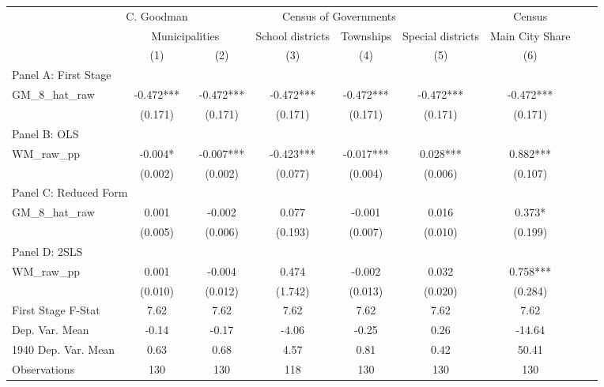  \begin{tabular}{l*{8}{c}} \toprule
&\multicolumn{1}{c}{C. Goodman}&\multicolumn{4}{c}{Census of Governments}&\multicolumn{1}{c}{Census}\\\cmidrule(lr){2-2}\cmidrule(lr){3-6}\cmidrule(lr){7-7}
&\multicolumn{2}{c}{Municipalities}&\multicolumn{1}{c}{School districts}&\multicolumn{1}{c}{Townships}&\multicolumn{1}{c}{Special districts}&\multicolumn{1}{c}{Main City Share}\\\cmidrule(lr){2-3}\cmidrule(lr){4-6}\cmidrule(lr){7-7}
&\multicolumn{1}{c}{(1)}&\multicolumn{1}{c}{(2)}&\multicolumn{1}{c}{(3)}&\multicolumn{1}{c}{(4)}&\multicolumn{1}{c}{(5)}&\multicolumn{1}{c}{(6)}\\
\cmidrule(lr){1-7}
\multicolumn{6}{l}{Panel A: First Stage}\\
\cmidrule(lr){1-7}
GM\_8\_hat\_raw    &   -0.472***&   -0.472***&   -0.472***&   -0.472***&   -0.472***&   -0.472***\\
                &  (0.171)   &  (0.171)   &  (0.171)   &  (0.171)   &  (0.171)   &  (0.171)   \\
\cmidrule(lr){1-7}
\multicolumn{6}{l}{Panel B: OLS}\\
\cmidrule(lr){1-7}
WM\_raw\_pp       &   -0.004*  &   -0.007***&   -0.423***&   -0.017***&    0.028***&    0.882***\\
                &  (0.002)   &  (0.002)   &  (0.077)   &  (0.004)   &  (0.006)   &  (0.107)   \\
\cmidrule(lr){1-7}
\multicolumn{6}{l}{Panel C: Reduced Form}\\
\cmidrule(lr){1-7}
GM\_8\_hat\_raw    &    0.001   &   -0.002   &    0.077   &   -0.001   &    0.016   &    0.373*  \\
                &  (0.005)   &  (0.006)   &  (0.193)   &  (0.007)   &  (0.010)   &  (0.199)   \\
\cmidrule(lr){1-7}
\multicolumn{6}{l}{Panel D: 2SLS}\\
\cmidrule(lr){1-7}
WM\_raw\_pp       &    0.001   &   -0.004   &    0.474   &   -0.002   &    0.032   &    0.758***\\
                &  (0.010)   &  (0.012)   &  (1.742)   &  (0.013)   &  (0.020)   &  (0.284)   \\
\midrule
First Stage F-Stat&     7.62   &     7.62   &     7.62   &     7.62   &     7.62   &     7.62   \\
Dep. Var. Mean  &    -0.14   &    -0.17   &    -4.06   &    -0.25   &     0.26   &   -14.64   \\
1940 Dep. Var. Mean&     0.63   &     0.68   &     4.57   &     0.81   &     0.42   &    50.41   \\
Observations    &      130   &      130   &      118   &      130   &      130   &      130   \\
 \bottomrule \end{tabular}
